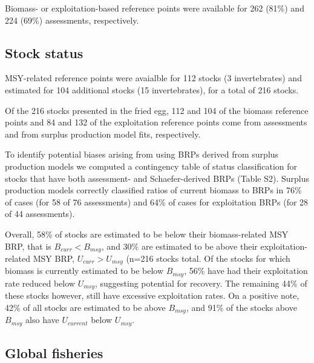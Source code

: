 Biomass- or exploitation-based reference points were available for
262 (81\%) and
224 (69\%)
assessments, respectively.

\subsection*{Stock status}
\noindent

MSY-related reference points were avaialble for
112 stocks
(3 invertebrates) and estimated
for 104 additional stocks
(15 invertebrates), for a total of
216 stocks.

Of the
216 stocks presented in
the fried egg, 112 and
104 of the biomass reference points and
84 and
132 of the exploitation reference
points come from assessments and from surplus production model fits,
respectively.

To identify potential biases arising from using BRPs
derived from surplus production models we computed a contingency table
of status classification for stocks that have both assessment- and
Schaefer-derived BRPs (Table S2). Surplus production models correctly
classified ratios of current biomass to BRPs in
76\% of cases (for 58
of 76 assessments) and 64\%
of cases for exploitation BRPs (for 28 of
44 assessments).

Overall, 58\% of stocks are estimated
to be below their biomass-related MSY BRP, that is $B_{curr}<B_{msy}$,
and 30\% are estimated to be above
their exploitation-related MSY BRP, $U_{curr}>U_{msy}$
(n=216 stocks total.
Of the stocks for which biomass is currently estimated to be below
$B_{msy}$, 56\% have had their
exploitation rate reduced below $U_{msy}$, suggesting potential for
recovery. The remaining
44\% of these stocks however,
still have excessive exploitation rates. On a positive note,
42\% of all stocks are estimated to
be above $B_{msy}$, and 91\%
of the stocks above $B_{msy}$ also have $U_{current}$ below $U_{msy}$.


\subsection*{Global fisheries}

